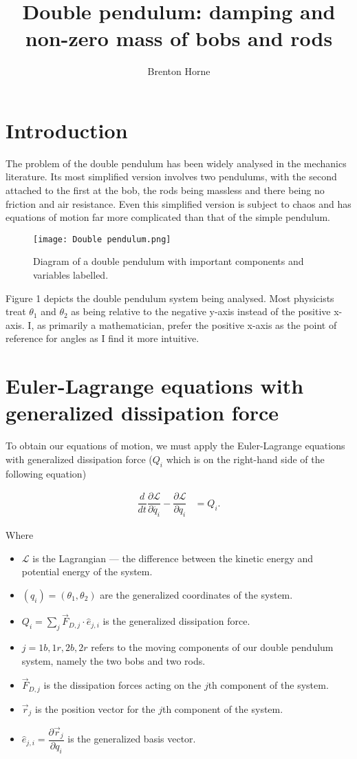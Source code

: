\documentclass[12pt,a4paper,portrait]{article}
\date{}
\title{Double pendulum: damping and non-zero mass of bobs and rods}
\author{Brenton Horne}
\newcommand{\lag}{\mathcal{L}}
\begin{document}
	\maketitle
	\tableofcontents
	
	\section{Introduction}
	The problem of the double pendulum has been widely analysed in the mechanics literature. Its most simplified version involves two pendulums, with the second attached to the first at the bob, the rods being massless and there being no friction and air resistance. Even this simplified version is subject to chaos and has equations of motion far more complicated than that of the simple pendulum.  
	\begin{figure}[H]
		\centering
		\texttt{[image: Double pendulum.png]}
		\caption{Diagram of a double pendulum with important components and variables labelled.}
	\end{figure}
	Figure 1 depicts the double pendulum system being analysed. Most physicists treat $\theta_1$ and $\theta_2$ as being relative to the negative y-axis instead of the positive x-axis. I, as primarily a mathematician, prefer the positive x-axis as the point of reference for angles as I find it more intuitive. 
	
	\section{Euler-Lagrange equations with generalized dissipation force}
	To obtain our equations of motion, we must apply the Euler-Lagrange equations with generalized dissipation force ($Q_i$ which is on the right-hand side of the following equation)
	
	\begin{align}
		\dfrac{d}{dt}\dfrac{\partial \lag}{\partial \dot{q_i}} - \dfrac{\partial \lag}{\partial q_i} &=  Q_i. \label{ELD}
	\end{align}
	
	Where
	\begin{itemize}
		\item $\lag$ is the Lagrangian --- the difference between the kinetic energy and potential energy of the system. 
		\item $(q_i)=(\theta_1,\theta_2)$ are the generalized coordinates of the system.
		\item $Q_i=\displaystyle \sum_j \vec{F}_{D,j} \cdot \hat{e}_{j,i}$ is the generalized dissipation force.
		\item $j=1b,1r,2b,2r$ refers to the moving components of our double pendulum system, namely the two bobs and two rods.
		\item $\vec{F}_{D,j}$ is the dissipation forces acting on the $j$th component of the system.
		\item $\vec{r}_j$ is the position vector for the $j$th component of the system.
		\item $\hat{e}_{j,i}=\dfrac{\partial \vec{r}_j}{\partial q_i}$ is the generalized basis vector.
	\end{itemize}
	
\end{document}

